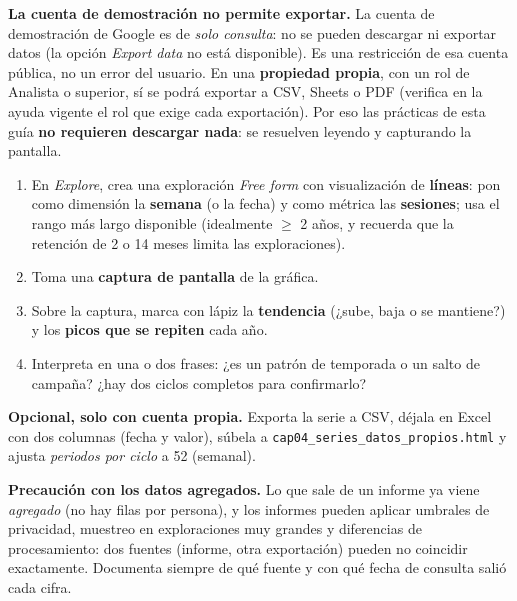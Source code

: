 \documentclass[11pt,letterpaper]{article}
\begin{document}
\begin{cajaNota}
\textbf{La cuenta de demostración no permite exportar.} La cuenta de demostración de Google es de \emph{solo consulta}: no se pueden descargar ni exportar datos (la opción \emph{Export data} no está disponible). Es una restricción de esa cuenta pública, no un error del usuario. En una \textbf{propiedad propia}, con un rol de Analista o superior, sí se podrá exportar a CSV, Sheets o PDF (verifica en la ayuda vigente el rol que exige cada exportación). Por eso las prácticas de esta guía \textbf{no requieren descargar nada}: se resuelven leyendo y capturando la pantalla.
\end{cajaNota}

\begin{cajaPasos}[title={Práctica: leer una serie en pantalla (tendencia y estacionalidad)}]
\begin{enumerate}[nosep,label=\arabic*.]
  \item En \emph{Explore}, crea una exploración \emph{Free form} con visualización de \textbf{líneas}: pon como dimensión la \textbf{semana} (o la fecha) y como métrica las \textbf{sesiones}; usa el rango más largo disponible (idealmente $\geq$ 2 años, y recuerda que la retención de 2 o 14 meses limita las exploraciones).
  \item Toma una \textbf{captura de pantalla} de la gráfica.
  \item Sobre la captura, marca con lápiz la \textbf{tendencia} (¿sube, baja o se mantiene?) y los \textbf{picos que se repiten} cada año.
  \item Interpreta en una o dos frases: ¿es un patrón de temporada o un salto de campaña? ¿hay dos ciclos completos para confirmarlo?
\end{enumerate}
\end{cajaPasos}

\textbf{Opcional, solo con cuenta propia.} Exporta la serie a CSV, déjala en Excel con dos columnas (fecha y valor), súbela a \texttt{cap04\_series\_datos\_propios.html} y ajusta \emph{periodos por ciclo} a 52 (semanal).

\textbf{Precaución con los datos agregados.} Lo que sale de un informe ya viene \emph{agregado} (no hay filas por persona), y los informes pueden aplicar umbrales de privacidad,
muestreo en exploraciones muy grandes y diferencias de procesamiento: dos fuentes (informe, otra exportación) pueden no coincidir exactamente. Documenta siempre de qué
fuente y con qué fecha de consulta salió cada cifra.
\end{document}
